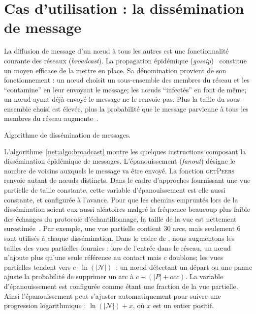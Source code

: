 
\section{Cas d'utilisation : la dissémination de message}
\label{net:sec:usecase}

La diffusion de message d'un nœud à tous les autres est une fonctionnalité
courante des réseaux (\emph{broadcast}). La propagation épidémique
(\emph{gossip})~\cite{birman1999bimodal} constitue un moyen efficace de la
mettre en place. Sa dénomination provient de son fonctionnement : un nœud
choisit un sous-ensemble des membres du réseau et les ``contamine'' en leur
envoyant le message; les nœuds ``infectés'' en font de même; un nœud ayant déjà
envoyé le message ne le renvoie pas. Plus la taille du sous-ensemble choisi est
élevée, plus la probabilité que le message parvienne à tous les membres du réseau
augmente~\cite{erdos1959random}.

\begin{algorithm}
  
  \caption[Algorithme de dissémination de
  messages]{\label{net:algo:broadcast}Algorithme de dissémination de messages.}
\end{algorithm}


L'algorithme~\ref{net:algo:broadcast} montre les quelques instructions composant
la dissémination épidémique de messages. L'épanouissement (\emph{fanout})
désigne le nombre de voisins auxquels le message va être envoyé. La fonction
\textsc{getPeers} renvoie autant de nœuds distincts. Dans le cadre d'approches
fournissant une vue partielle de taille constante, cette variable
d'épanouissement est elle aussi constante, et configurée à l'avance. Pour que
les chemins empruntés lors de la dissémination soient eux aussi aléatoires
malgré la fréquence beaucoup plus faible des échanges du protocole
d'échantillonnage, la taille de la vue est nettement
surestimée~\cite{frey2009heterogeneous}. Par exemple, une vue partielle contient
30 arcs, mais seulement 6 sont utilisés à chaque dissémination. Dans le cadre de
\SPRAY, nous augmentons les tailles des vues partielles fournies : lors de
l'entrée dans le réseau, un nœud n'ajoute plus qu'une seule référence au contact
mais $c$ doublons; les vues partielles tendent vers
$c\cdot\ln(|\mathcal{N}|)$~\cite{ganesh2003peer}; un nœud détectant un départ ou
une panne ajuste la probabilité de supprimer un arc à $c \div (|P|+occ)$. La
variable d'épanouissement est configurée comme étant une fraction de la vue
partielle. Ainsi l'épanouissement peut s'ajuster automatiquement pour suivre une
progression logarithmique : $\ln(|\mathcal{N}|)+x$, où $x$ est un entier
positif.


